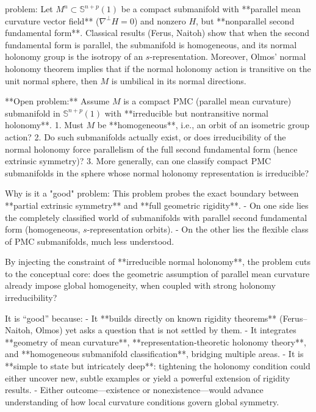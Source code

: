 problem:  
Let \(M^n \subset \mathbb{S}^{n+p}(1)\) be a compact submanifold with **parallel mean curvature vector field** (\(\nabla^\perp H = 0\)) and nonzero \(H\), but **nonparallel second fundamental form**. Classical results (Ferus, Naitoh) show that when the second fundamental form is parallel, the submanifold is homogeneous, and its normal holonomy group is the isotropy of an \(s\)-representation. Moreover, Olmos’ normal holonomy theorem implies that if the normal holonomy action is transitive on the unit normal sphere, then \(M\) is umbilical in its normal directions.  

**Open problem:**  
Assume \(M\) is a compact PMC (parallel mean curvature) submanifold in \(\mathbb{S}^{n+p}(1)\) with **irreducible but nontransitive normal holonomy**.  
1. Must \(M\) be **homogeneous**, i.e., an orbit of an isometric group action?  
2. Do such submanifolds actually exist, or does irreducibility of the normal holonomy force parallelism of the full second fundamental form (hence extrinsic symmetry)?  
3. More generally, can one classify compact PMC submanifolds in the sphere whose normal holonomy representation is irreducible?

Why is it a "good" problem:  
This problem probes the exact boundary between **partial extrinsic symmetry** and **full geometric rigidity**.  
- On one side lies the completely classified world of submanifolds with parallel second fundamental form (homogeneous, \(s\)-representation orbits).  
- On the other lies the flexible class of PMC submanifolds, much less understood.  

By injecting the constraint of **irreducible normal holonomy**, the problem cuts to the conceptual core: does the geometric assumption of parallel mean curvature already impose global homogeneity, when coupled with strong holonomy irreducibility?  

It is “good” because:  
- It **builds directly on known rigidity theorems** (Ferus–Naitoh, Olmos) yet asks a question that is not settled by them.  
- It integrates **geometry of mean curvature**, **representation‑theoretic holonomy theory**, and **homogeneous submanifold classification**, bridging multiple areas.  
- It is **simple to state but intricately deep**: tightening the holonomy condition could either uncover new, subtle examples or yield a powerful extension of rigidity results.  
- Either outcome—existence or nonexistence—would advance understanding of how local curvature conditions govern global symmetry.